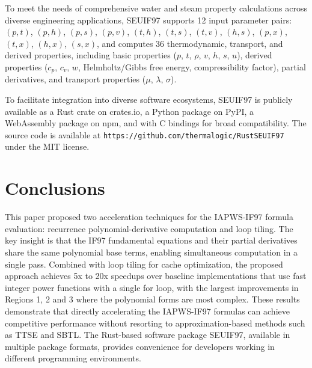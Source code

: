 \documentclass{article}
\begin{document}
To meet the needs of comprehensive water and steam property calculations across diverse engineering applications, SEUIF97 supports 12 input parameter pairs: $(p,t)$, $(p,h)$, $(p,s)$, $(p,v)$, $(t,h)$, $(t,s)$, $(t,v)$, $(h,s)$, $(p,x)$, $(t,x)$, $(h,x)$, $(s,x)$, and computes 36 thermodynamic, transport, and derived properties, including basic properties ($p$, $t$, $\rho$, $v$, $h$, $s$, $u$), derived properties ($c_p$, $c_v$, $w$, Helmholtz/Gibbs free energy, compressibility factor), partial derivatives, and transport properties ($\mu$, $\lambda$, $\sigma$).

To facilitate integration into diverse software ecosystems, SEUIF97 is publicly available as a Rust crate on crates.io, a Python package on PyPI, a WebAssembly package on npm, and with C bindings for broad compatibility. The source code is available at \texttt{https://github.com/thermalogic/RustSEUIF97} under the MIT license.

\section{Conclusions}

This paper proposed two acceleration techniques for the IAPWS-IF97 formula evaluation: recurrence polynomial-derivative computation and loop tiling. The key insight is that the IF97 fundamental equations and their partial derivatives share the same polynomial base terms, enabling simultaneous computation in a single pass. Combined with loop tiling for cache optimization, the proposed approach achieves 5x to 20x speedups over baseline implementations that use fast integer power functions with a single for loop, with the largest improvements in Regions 1, 2 and 3 where the polynomial forms are most complex. These results demonstrate that directly accelerating the IAPWS-IF97 formulas can achieve competitive performance without resorting to approximation-based methods such as TTSE and SBTL. The Rust-based software package SEUIF97, available in multiple package formats, provides convenience for developers working in different programming environments.
\end{document}
